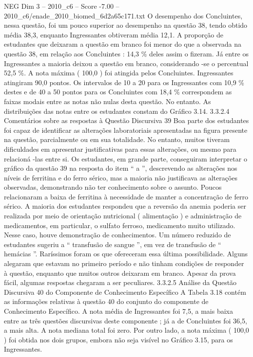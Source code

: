 \begin{textsample}{NEG Dim 3 – 2010\_c6 – Score -7.00 – 2010\_c6/enade\_2010\_biomed\_6d2a65c171.txt}
O desempenho dos Concluintes, nessa questão, foi um pouco superior ao desempenho na questão 38, tendo obtido média 38,3, enquanto Ingressantes obtiveram média 12,1.
A proporção de estudantes que deixaram a questão em branco foi menor do que a observada na questão 38, em relação aos Concluintes : 14,3 \% deles assim o fizeram.
Já entre os Ingressantes a maioria deixou a questão em branco, considerando -se o percentual 52,5 \%.
A nota máxima ( 100,0 ) foi atingida pelos Concluintes.
Ingressantes atingiram 90,0 pontos.
Os intervalos de 10 a 20 para os Ingressantes com 10,9 \% destes e de 40 a 50 pontos para os Concluintes com 18,4 \% correspondem as faixas modais entre as notas não nulas desta questão.
No entanto.
As distribuições das notas entre os estudantes constam do Gráfico 3.14. 3.3.2.4 Comentários sobre as respostas à Questão Discursiva 39 Boa parte dos estudantes foi capaz de identificar as alterações laboratoriais apresentadas na figura presente na questão, parcialmente ou em sua totalidade.
No entanto, muitos tiveram dificuldades em apresentar justificativas para essas alterações, ou mesmo para relacioná -las entre si.
Os estudantes, em grande parte, conseguiram interpretar o gráfico da questão 39 na resposta do item “ a ”, descrevendo as alterações nos níveis de ferritina e do ferro sérico, mas a maioria não justificava as alterações observadas, demonstrando não ter conhecimento sobre o assunto.
Poucos relacionaram a baixa de ferritina à necessidade de manter a concentração de ferro sérico.
A maioria dos estudantes respondeu que a reversão da anemia poderia ser realizada por meio de orientação nutricional ( alimentação ) e administração de medicamentos, em particular, o sulfato ferroso, medicamento muito utilizado.
Nesse caso, houve demonstração de conhecimentos.
Um número reduzido de estudantes sugeriu a “ transfusão de sangue ”, em vez de transfusão de “ hemácias ”.
Raríssimos foram os que ofereceram essa última possibilidade.
Alguns alegaram que estavam no primeiro período e não tinham condições de responder à questão, enquanto que muitos outros deixaram em branco.
Apesar da prova fácil, algumas respostas chegaram a ser peculiares. 3.3.2.5 Análise da Questão Discursiva 40 do Componente de Conhecimento Específico A Tabela 3.18 contém as informações relativas à questão 40 do conjunto do componente de Conhecimento Específico.
A nota média de Ingressantes foi 7,5, a mais baixa entre as três questões discursivas deste componente ; já a de Concluintes foi 36,5, a mais alta.
A nota mediana total foi zero.
Por outro lado, a nota máxima ( 100,0 ) foi obtida nos dois grupos, embora não seja visível no Gráfico 3.15, para os Ingressantes.

\end{textsample}
